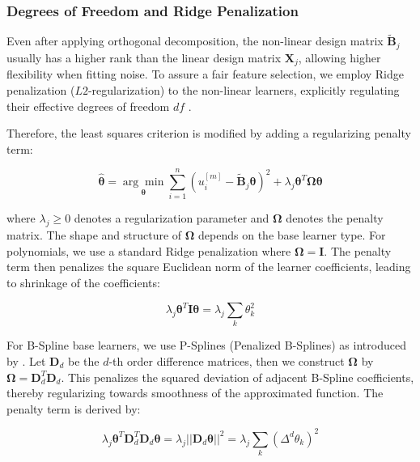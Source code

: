 \documentclass[fontsize=12 pt]{scrartcl}
\begin{document}
\subsubsection{Degrees of Freedom and Ridge Penalization}
\label{sec:df_ridge}

Even after applying orthogonal decomposition, the non-linear design matrix $\tilde{\mathbf{B}}_j$ usually has a higher rank than the linear design matrix $\mathbf{X}_j$, allowing higher flexibility when fitting noise. To assure a fair feature selection, we employ Ridge penalization ($L2$-regularization) to the non-linear learners, explicitly regulating their effective degrees of freedom $df$ \citep{hofner2011selection}.

Therefore, the least squares criterion is modified by adding a regularizing penalty term:

\begin{equation}
    \hat{\boldsymbol{\theta}} = \underset{\boldsymbol{\theta}}{\arg \min} \sum_{i=1}^n \left( u_i^{[m]} - \tilde{\mathbf{B}}_j \boldsymbol{\theta} \right)^2 + \lambda_j \boldsymbol{\theta}^T \boldsymbol{\Omega} \boldsymbol{\theta}
\end{equation}

where $\lambda_j \geq 0$ denotes a regularization parameter and $\boldsymbol{\Omega}$ denotes the penalty matrix. The shape and structure of $\boldsymbol{\Omega}$ depends on the base learner type. For polynomials, we use a standard Ridge penalization where $\boldsymbol{\Omega} = \mathbf{I}$. The penalty term then penalizes the square Euclidean norm of the learner coefficients, leading to shrinkage of the coefficients: 

\begin{equation}
    \lambda_j \boldsymbol{\theta}^T \mathbf{I} \boldsymbol{\theta} = \lambda_j \sum_{k} \theta_k^2
\end{equation}

For B-Spline base learners, we use P-Splines (Penalized B-Splines) as introduced by \citep{eilers1996flexible}. Let $\mathbf{D}_d$ be the $d$-th order difference matrices, then we construct $\boldsymbol{\Omega}$ by $\boldsymbol{\Omega} = \mathbf{D}_d^T \mathbf{D}_d$. This penalizes the squared deviation of adjacent B-Spline coefficients, thereby regularizing towards smoothness of the approximated function. The penalty term is derived by:

\begin{equation}
    \lambda_j \boldsymbol{\theta}^T \mathbf{D}_d^T \mathbf{D}_d \boldsymbol{\theta} = \lambda_j ||\mathbf{D}_d \boldsymbol{\theta}||^2 = \lambda_j \sum_{k} (\Delta^d \theta_k)^2
\end{equation}
\end{document}
